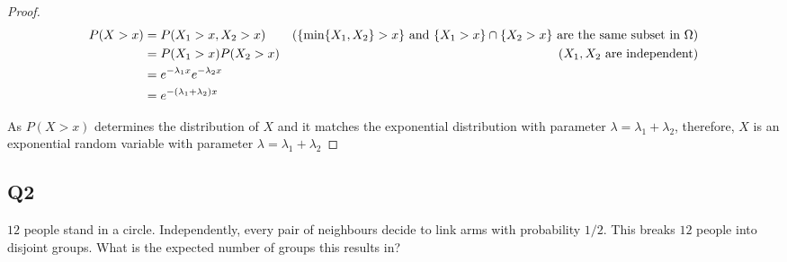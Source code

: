 \documentclass{article}
\begin{document}
\begin{proof}

\begin{align*}
    P(X > x)
    &= P(X_1 > x, X_2 > x) &\text{($\{\min\{X_1, X_2\} > x\}$ and $\{X_1 > x\} \cap \{X_2 > x\}$ are the same subset in $\Omega$)}\\
    &= P(X_1 > x) P(X_2 > x) &\text{($X_1, X_2$ are independent)} \\
    &= e^{- \lambda_1 x} e^{-\lambda_2 x} \\
    &= e^{- (\lambda_1 + \lambda_2) x}
\end{align*}

As $P(X > x)$ determines the distribution of $X$ and it matches the exponential distribution with parameter $\lambda = \lambda_1 + \lambda_2$, therefore, $X$ is an exponential random variable with parameter $\lambda = \lambda_1 + \lambda_2$

\end{proof}

\subsection{Q2}

$12$ people stand in a circle. Independently, every pair of neighbours decide to link arms with probability $1/2$. This breaks $12$ people into disjoint groups. What is the expected number of groups this results in?
\end{document}
